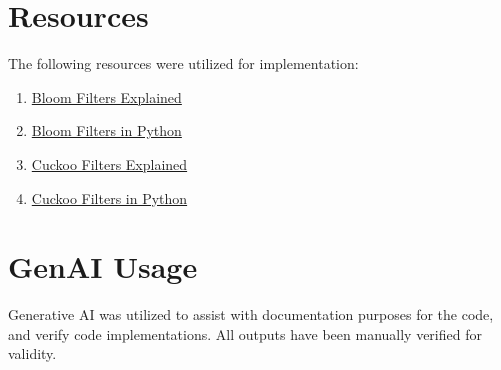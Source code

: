 \documentclass[acmsmall,screen, nonacm]{acmart}
\begin{document}
\section{Resources}

The following resources were utilized for implementation:
\begin{enumerate}
	\item \href{https://techtonics.medium.com/bloom-filters-your-guide-to-high-performance-data-structures-4db4df3a7838}{Bloom Filters Explained}
	\item \href{https://techtonics.medium.com/implementing-bloom-filters-in-python-and-understanding-its-error-probability-a-step-by-step-guide-13c6cb2e05b7}{Bloom Filters in Python}
	\item \href{https://brilliant.org/wiki/cuckoo-filter/}{Cuckoo Filters Explained}
	\item \href{https://github.com/huydhn/cuckoo-filter}{Cuckoo Filters in Python}
\end{enumerate}




\section{GenAI Usage}
Generative AI was utilized to assist with documentation purposes for the code, and verify code implementations.
All outputs have been manually verified for validity.



\end{document}
